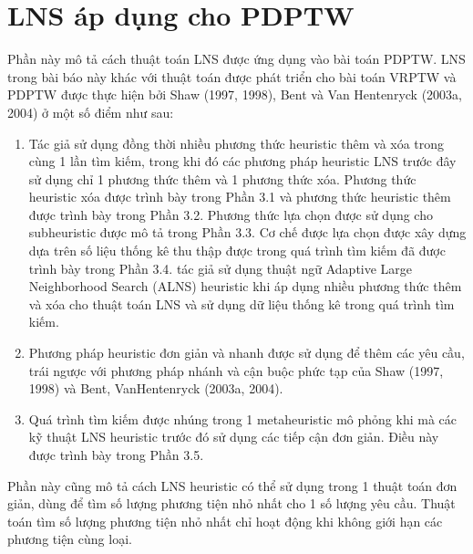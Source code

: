 
\chapter{LNS áp dụng cho PDPTW}
Phần này mô tả cách thuật toán LNS được ứng dụng vào bài toán PDPTW. LNS trong bài báo này khác với thuật toán được phát triển cho bài toán VRPTW và PDPTW được thực hiện bởi Shaw (1997, 1998), Bent và Van Hentenryck (2003a, 2004) ở một số điểm như sau:
\begin{enumerate}
    \item Tác giả sử dụng đồng thời nhiều phương thức heuristic thêm và xóa trong cùng 1 lần tìm kiếm, trong khi đó các phương pháp heuristic LNS trước đây sử dụng chỉ 1 phương thức thêm và 1 phương thức xóa. Phương thức heuristic xóa được trình bày trong Phần 3.1 và phương thức heuristic thêm được trình bày trong Phần 3.2. Phương thức lựa chọn được sử dụng cho subheuristic được mô tả trong Phần 3.3. Cơ chế được lựa chọn được xây dựng dựa trên số liệu thống kê thu thập được trong quá trình tìm kiếm đã được trình bày trong Phần 3.4. tác giả sử dụng thuật ngữ Adaptive Large Neighborhood Search (ALNS) heuristic khi áp dụng nhiều phương thức thêm và xóa cho thuật toán LNS và sử dụng dữ liệu thống kê trong quá trình tìm kiếm.
    \item Phương pháp heuristic đơn giản và nhanh được sử dụng để thêm các yêu cầu, trái ngược với phương pháp nhánh và cận buộc phức tạp của Shaw (1997, 1998) và Bent, VanHentenryck (2003a, 2004).
    \item Quá trình tìm kiếm được nhúng trong 1 metaheuristic mô phỏng khi mà các kỹ thuật LNS heuristic trước đó sử dụng các tiếp cận đơn giản. Điều này được trình bày trong Phần 3.5.
\end{enumerate}
Phần này cũng mô tả cách LNS heuristic có thể sử dụng trong 1 thuật toán đơn giản, dùng để tìm số lượng phương tiện nhỏ nhất cho 1 số lượng yêu cầu. Thuật toán tìm số lượng phương tiện nhỏ nhất chỉ hoạt động khi không giới hạn các phương tiện cùng loại.









